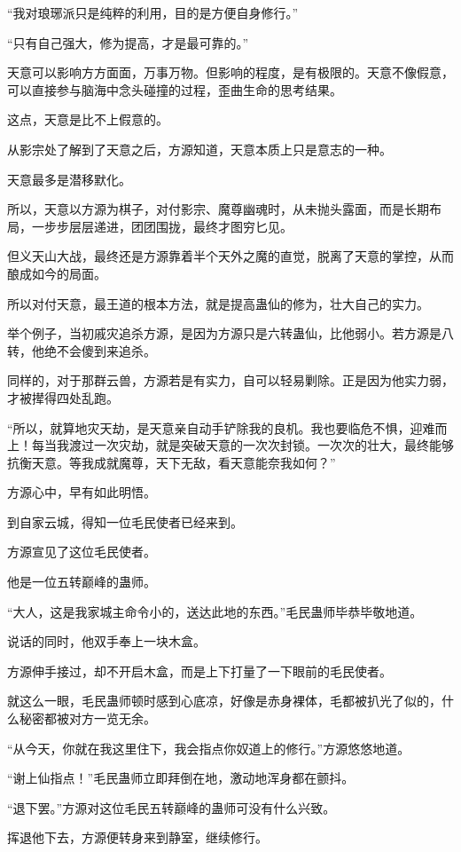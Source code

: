 \begin{this_body}
“我对琅琊派只是纯粹的利用，目的是方便自身修行。”

“只有自己强大，修为提高，才是最可靠的。”

天意可以影响方方面面，万事万物。但影响的程度，是有极限的。天意不像假意，可以直接参与脑海中念头碰撞的过程，歪曲生命的思考结果。

这点，天意是比不上假意的。

从影宗处了解到了天意之后，方源知道，天意本质上只是意志的一种。

天意最多是潜移默化。

所以，天意以方源为棋子，对付影宗、魔尊幽魂时，从未抛头露面，而是长期布局，一步步层层递进，团团围拢，最终才图穷匕见。

但义天山大战，最终还是方源靠着半个天外之魔的直觉，脱离了天意的掌控，从而酿成如今的局面。

所以对付天意，最王道的根本方法，就是提高蛊仙的修为，壮大自己的实力。

举个例子，当初戚灾追杀方源，是因为方源只是六转蛊仙，比他弱小。若方源是八转，他绝不会傻到来追杀。

同样的，对于那群云兽，方源若是有实力，自可以轻易剿除。正是因为他实力弱，才被撵得四处乱跑。

“所以，就算地灾天劫，是天意亲自动手铲除我的良机。我也要临危不惧，迎难而上！每当我渡过一次灾劫，就是突破天意的一次次封锁。一次次的壮大，最终能够抗衡天意。等我成就魔尊，天下无敌，看天意能奈我如何？”

方源心中，早有如此明悟。

到自家云城，得知一位毛民使者已经来到。

方源宣见了这位毛民使者。

他是一位五转巅峰的蛊师。

“大人，这是我家城主命令小的，送达此地的东西。”毛民蛊师毕恭毕敬地道。

说话的同时，他双手奉上一块木盒。

方源伸手接过，却不开启木盒，而是上下打量了一下眼前的毛民使者。

就这么一眼，毛民蛊师顿时感到心底凉，好像是赤身裸体，毛都被扒光了似的，什么秘密都被对方一览无余。

“从今天，你就在我这里住下，我会指点你奴道上的修行。”方源悠悠地道。

“谢上仙指点！”毛民蛊师立即拜倒在地，激动地浑身都在颤抖。

“退下罢。”方源对这位毛民五转巅峰的蛊师可没有什么兴致。

挥退他下去，方源便转身来到静室，继续修行。


\end{this_body}
